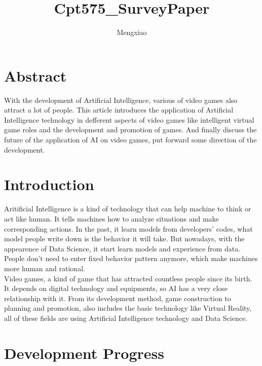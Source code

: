 \documentclass[12pt]{article}
\author{Mengxiao}
\title{Cpt575\_SurveyPaper}
\begin{document}
	\maketitle
	\pagebreak
    \section{Abstract}
        With the development of Artificial Intelligence, various of video games also
        attract a lot of people. This article introduces the application of Artificial
        Intelligence technology in defferent aspects of video games like intelligent virtual
        game roles and the development and promotion of games. And finally discuss the future
        of the application of AI on video games, put forward some direction of the development.
	\section{Introduction}
        Aritificial Intelligence is a kind of technology that can help machine to think or
        act like human. It tells machines how to analyze situations and make corresponding
        actions. In the past, it learn models from developers' codes, what model people write
        down is the behavior it will take. But nowadays, with the appearence of Data Science, it
        start learn models and experience from data. People don't need to enter fixed behavior
        pattern anymore, which make machines more human and rational.\\
        
        Video games, a kind of game that has attracted countless people since its birth. It depends
        on digital technology and equipments, so AI has a very close relationship with it. From
        its development method, game construction to planning and promotion, also includes the
        basic technology like Virtual Reality, all of these fields are using Artificial Intelligence
        technology and Data Science.
    \section{Development Progress}
\end{document}
